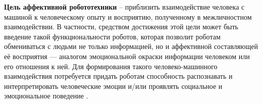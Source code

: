\textbf{Цель аффективной робототехники} -- приблизить взаимодействие человека с машиной к человеческому опыту и восприятию, полученному в межличностном взаимодействии. В частности, средством достижения этой цели может быть введение такой функциональности роботов, которая позволит роботам обмениваться с людьми не только информацией, но и аффективной составляющей её восприятия --- аналогом эмоциональной окраски информации человеком или его отношения к ней. Для формирования такого человеко-машинного взаимодействия потребуется придать роботам способность распознавать и интерпретировать человеческие эмоции и/или проявлять социальное и эмоциональное поведение \cite{affect-rob-goal}.


